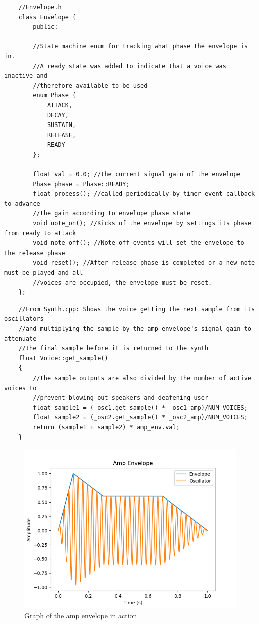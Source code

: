 \documentclass[acmlarge,screen]{acmart}
\begin{document}
	\begin{verbatim}
	//Envelope.h
	class Envelope {
		public:
		
		//State machine enum for tracking what phase the envelope is in.
		//A ready state was added to indicate that a voice was inactive and
		//therefore available to be used
		enum Phase {
			ATTACK,
			DECAY,
			SUSTAIN,
			RELEASE,
			READY 
		};
		
		float val = 0.0; //the current signal gain of the envelope
		Phase phase = Phase::READY;
		float process(); //called periodically by timer event callback to advance
		//the gain according to envelope phase state
		void note_on(); //Kicks of the envelope by settings its phase from ready to attack
		void note_off(); //Note off events will set the envelope to the release phase
		void reset(); //After release phase is completed or a new note must be played and all
		//voices are occupied, the envelope must be reset.
	};
	\end{verbatim}
	
	\clearpage
	
	\begin{verbatim}
	//From Synth.cpp: Shows the voice getting the next sample from its oscillators
	//and multiplying the sample by the amp envelope's signal gain to attenuate
	//the final sample before it is returned to the synth
	float Voice::get_sample()
	{   
		//the sample outputs are also divided by the number of active voices to
		//prevent blowing out speakers and deafening user
		float sample1 = (_osc1.get_sample() * _osc1_amp)/NUM_VOICES;
		float sample2 = (_osc2.get_sample() * _osc2_amp)/NUM_VOICES;
		return (sample1 + sample2) * amp_env.val;
	}
	\end{verbatim}
	
	\begin{figure}
		\centering
		\includegraphics[width=.8\linewidth]{amp_envelope_visual}
		\caption{Graph of the amp envelope in action}
	\end{figure}
	
\end{document}
